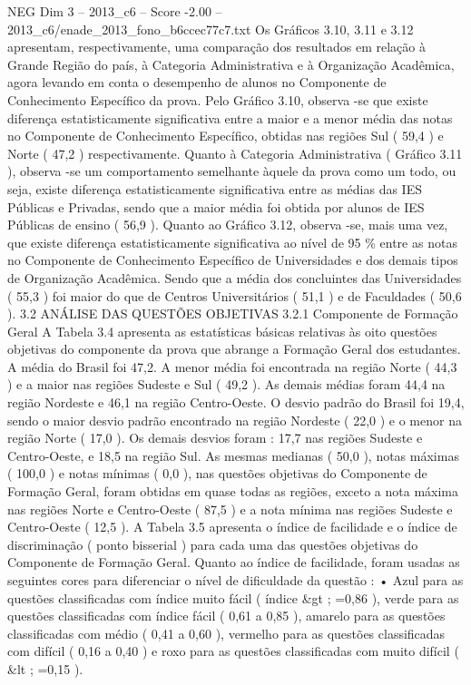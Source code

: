 \begin{textsample}{NEG Dim 3 – 2013\_c6 – Score -2.00 – 2013\_c6/enade\_2013\_fono\_b6ccec77c7.txt}
Os Gráficos 3.10, 3.11 e 3.12 apresentam, respectivamente, uma comparação dos resultados em relação à Grande Região do país, à Categoria Administrativa e à Organização Acadêmica, agora levando em conta o desempenho de alunos no Componente de Conhecimento Específico da prova.
Pelo Gráfico 3.10, observa -se que existe diferença estatisticamente significativa entre a maior e a menor média das notas no Componente de Conhecimento Específico, obtidas nas regiões Sul ( 59,4 ) e Norte ( 47,2 ) respectivamente.
Quanto à Categoria Administrativa ( Gráfico 3.11 ), observa -se um comportamento semelhante àquele da prova como um todo, ou seja, existe diferença estatisticamente significativa entre as médias das IES Públicas e Privadas, sendo que a maior média foi obtida por alunos de IES Públicas de ensino ( 56,9 ).
Quanto ao Gráfico 3.12, observa -se, mais uma vez, que existe diferença estatisticamente significativa ao nível de 95 \% entre as notas no Componente de Conhecimento Específico de Universidades e dos demais tipos de Organização Acadêmica.
Sendo que a média dos concluintes das Universidades ( 55,3 ) foi maior do que de Centros Universitários ( 51,1 ) e de Faculdades ( 50,6 ). 3.2 ANÁLISE DAS QUESTÕES OBJETIVAS 3.2.1 Componente de Formação Geral A Tabela 3.4 apresenta as estatísticas básicas relativas às oito questões objetivas do componente da prova que abrange a Formação Geral dos estudantes.
A média do Brasil foi 47,2.
A menor média foi encontrada na região Norte ( 44,3 ) e a maior nas regiões Sudeste e Sul ( 49,2 ).
As demais médias foram 44,4 na região Nordeste e 46,1 na região Centro-Oeste.
O desvio padrão do Brasil foi 19,4, sendo o maior desvio padrão encontrado na região Nordeste ( 22,0 ) e o menor na região Norte ( 17,0 ).
Os demais desvios foram : 17,7 nas regiões Sudeste e Centro-Oeste, e 18,5 na região Sul.
As mesmas medianas ( 50,0 ), notas máximas ( 100,0 ) e notas mínimas ( 0,0 ), nas questões objetivas do Componente de Formação Geral, foram obtidas em quase todas as regiões, exceto a nota máxima nas regiões Norte e Centro-Oeste ( 87,5 ) e a nota mínima nas regiões Sudeste e Centro-Oeste ( 12,5 ).
A Tabela 3.5 apresenta o índice de facilidade e o índice de discriminação ( ponto bisserial ) para cada uma das questões objetivas do Componente de Formação Geral.
Quanto ao índice de facilidade, foram usadas as seguintes cores para diferenciar o nível de dificuldade da questão : • Azul para as questões classificadas com índice muito fácil ( índice \&gt ; =0,86 ), verde para as questões classificadas com índice fácil ( 0,61 a 0,85 ), amarelo para as questões classificadas com médio ( 0,41 a 0,60 ), vermelho para as questões classificadas com difícil ( 0,16 a 0,40 ) e roxo para as questões classificadas com muito difícil ( \&lt ; =0,15 ).

\end{textsample}
